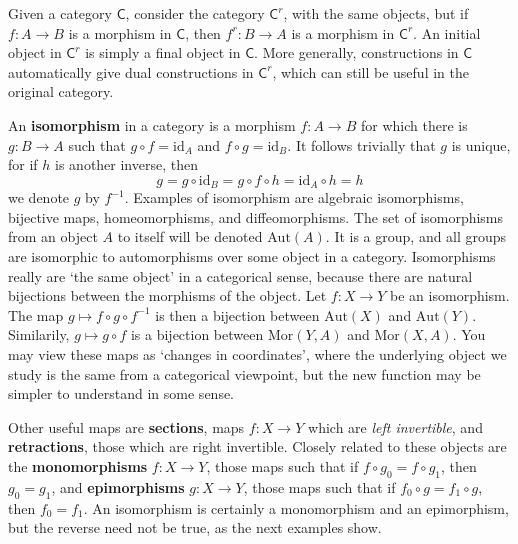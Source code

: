 \begin{example}
    Given a category $\mathsf{C}$, consider the category $\mathsf{C}^{r}$, with the same objects, but if $f: A \to B$ is a morphism in $\mathsf{C}$, then $f^{r}: B \to A$ is a morphism in $\mathsf{C}^{r}$. An initial object in $\mathsf{C}^{r}$ is simply a final object in $\mathsf{C}$. More generally, constructions in $\mathsf{C}$ automatically give dual constructions in $\mathsf{C}^r$, which can still be useful in the original category.
\end{example}

An {\bf isomorphism} in a category is a morphism $f:A \to B$ for which there is $g: B \to A$ such that $g \circ f = \text{id}_A$ and $f \circ g = \text{id}_B$. It follows trivially that $g$ is unique, for if $h$ is another inverse, then
%
\[ g = g \circ \text{id}_B = g \circ f \circ h = \text{id}_A \circ h = h \]
%
we denote $g$ by $f^{-1}$. Examples of isomorphism are algebraic isomorphisms, bijective maps, homeomorphisms, and diffeomorphisms. The set of isomorphisms from an object $A$ to itself will be denoted $\text{Aut}(A)$. It is a group, and all groups are isomorphic to automorphisms over some object in a category. Isomorphisms really are `the same object' in a categorical sense, because there are natural bijections between the morphisms of the object. Let $f: X \to Y$ be an isomorphism. The map $g \mapsto f \circ g \circ f^{-1}$ is then a bijection between $\text{Aut}(X)$ and $\text{Aut}(Y)$. Similarily, $g \mapsto g \circ f$ is a bijection between $\text{Mor}(Y,A)$ and $\text{Mor}(X,A)$. You may view these maps as `changes in coordinates', where the underlying object we study is the same from a categorical viewpoint, but the new function may be simpler to understand in some sense.

Other useful maps are {\bf sections}, maps $f: X \to Y$ which are {\it left invertible}, and {\bf retractions}, those which are right invertible. Closely related to these objects are the {\bf monomorphisms} $f: X \to Y$, those maps such that if $f \circ g_0 = f \circ g_1$, then $g_0 = g_1$, and {\bf epimorphisms} $g: X \to Y$, those maps such that if $f_0 \circ g = f_1 \circ g$, then $f_0 = f_1$. An isomorphism is certainly a monomorphism and an epimorphism, but the reverse need not be true, as the next examples show.

